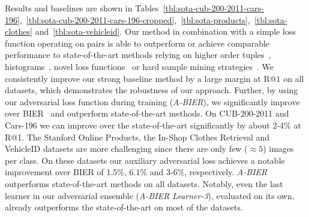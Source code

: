 \documentclass[10pt,journal,compsoc]{IEEEtran}
\begin{document}
Results and baselines are shown in
Tables~\ref{tbl:sota-cub-200-2011-cars-196},~\ref{tbl:sota-cub-200-2011-cars-196-cropped},~\ref{tbl:sota-products},~\ref{tbl:sota-clothes}
and~\ref{tbl:sota-vehicleid}.  Our method in combination with a simple loss
function operating on pairs is able to outperform or achieve comparable
performance to state-of-the-art methods relying on higher order
tuples~\cite{sohn2016improved, oh2016deep},
histograms~\cite{ustinova2016histogram}, novel loss
functions~\cite{wang2017iccv, movshovitz-attias2017iccv} or hard sample mining
strategies~\cite{yuan2016hard, harwood2017iccv, wu2017iccv}. We consistently
improve our strong baseline method by a large margin at R@$1$ on all datasets,
which demonstrates the robustness of our approach. Further, by using our
adversarial loss function during training (\emph{A-\ac{BIER}}), we significantly improve over
\ac{BIER}~\cite{opitz2017bier} and outperform state-of-the-art methods. On
CUB-200-2011 and Cars-196 we can improve over the state-of-the-art
significantly by about 2-4\% at R@1. The Stanford Online Products, the In-Shop
Clothes Retrieval and VehicleID datasets are more challenging since there are
only few ($\approx 5$) images per class.  On these datasets our auxiliary adversarial loss achieves a
notable improvement over \ac{BIER} of 1.5\%, 6.1\% and 3-6\%, respectively. \emph{A-\ac{BIER}} outperforms state-of-the-art methods on all datasets. 
Notably, even the last
learner in our adversarial ensemble (\emph{A-BIER Learner-3}), evaluated on its own, already outperforms the
state-of-the-art on most of the datasets.
\end{document}
